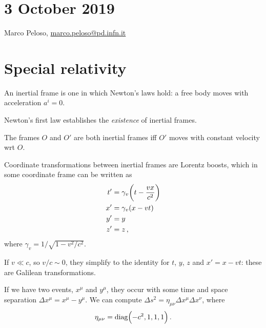 \documentclass[main.tex]{subfiles}
\begin{document}
\section*{3 October 2019}

Marco Peloso, \url{marco.peloso@pd.infn.it}

\section{Special relativity}

\begin{definition}
    An inertial frame is one in which Newton's laws hold: a free body moves with acceleration \(a^{i} = 0\).
\end{definition}

Newton's first law establishes the \emph{existence} of inertial frames.

\begin{proposition}
    The frames \(O\) and \(O'\) are both inertial frames iff \(O'\) moves with constant velocity wrt \(O\).
\end{proposition}

\begin{proposition}
    Coordinate transformations between inertial frames are Lorentz boosts, which in some coordinate frame can be written as
    \begin{subequations}
    \begin{align}
      t' &= \gamma_v \qty(t - \frac{vx}{c^2})  \\
      x' &= \gamma_v \qty(x - vt)  \\
      y' &= y \\
      z' &= z\,,
    \end{align}
    \end{subequations}
    where \(\gamma_v = 1/ \sqrt{1 - v^2 / c^2} \).
\end{proposition}

If \(v \ll c\), so \(v/c \sim 0\), they simplify to the identity for \(t\), \(y\), \(z\) and \(x' = x -vt\): these are Galilean transformations.

If we have two events, \(x^\mu\) and \(y^\mu\), they occur with some time and space separation \(\Delta x^\mu = x^\mu - y^\mu\). We can compute \(\Delta s^2 = \eta_{\mu\nu} \Delta x^\mu \Delta x^\nu \), where
%
\begin{equation}
  \eta_{\mu \nu} = \text{diag}\qty(-c^2, 1, 1, 1) \,.
\end{equation}
\end{document}
